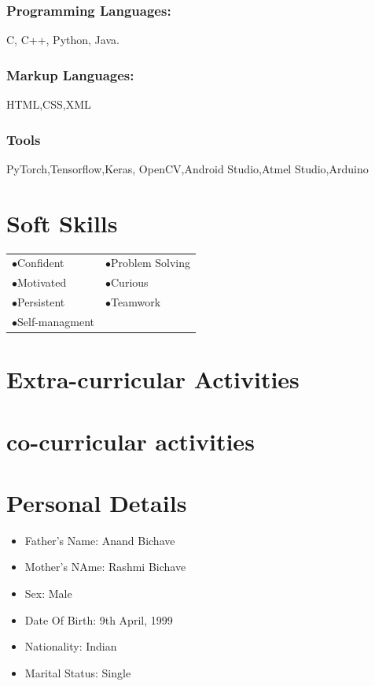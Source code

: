 \documentclass[10pt]{article}
\begin{document}
		\subsubsection{Programming Languages: }
			C, C++, Python, Java.
		\subsubsection{Markup Languages:}
			HTML,CSS,XML
		\subsubsection{Tools}
			PyTorch,Tensorflow,Keras, OpenCV,Android Studio,Atmel Studio,Arduino

\section{Soft Skills}
	\begin{tabular}{ l l }
	$\bullet$\large{Confident} & 	$\bullet$\large{Problem Solving}\\
	$\bullet$\large{Motivated} &	$\bullet$\large{Curious}\\
	$\bullet$\large{Persistent} &	$\bullet$\large{Teamwork}\\
	$\bullet$\large{Self-managment}\\
	\end{tabular}


\section{Extra-curricular Activities}



\section{co-curricular activities}



\section{Personal Details} 
\begin{itemize}

\item{Father's Name: Anand Bichave}
\item{Mother's NAme: Rashmi Bichave}
\item{Sex: Male}
\item{Date Of Birth: 9th April, 1999}
\item{Nationality: Indian}
\item{Marital Status: Single}

\end{itemize}
\end{document}
